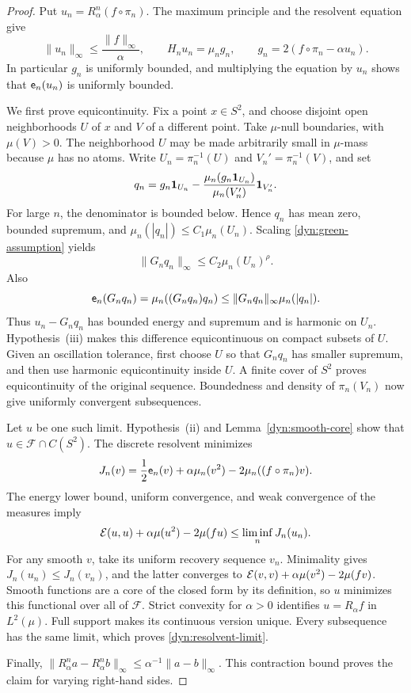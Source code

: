 \begin{proof}
Put $u_n=R^n_\alpha(f\circ\pi_n)$.  The maximum principle and the
resolvent equation give
\begin{equation}\label{dyn:resolvent-bounds}
 \|u_n\|_\infty\le\frac{\|f\|_\infty}{\alpha},
 \qquad
 H_nu_n=\mu_n g_n,
 \qquad
 g_n=2(f\circ\pi_n-\alpha u_n).
\end{equation}
In particular $g_n$ is uniformly bounded, and multiplying the equation
by $u_n$ shows that $\mathsf e_n(u_n)$ is uniformly bounded.

We first prove equicontinuity.  Fix a point $x\in S^2$, and choose
disjoint open neighborhoods $U$ of $x$ and $V$ of a different point.
Take $\mu$-null boundaries, with $\mu(V)>0$.  The neighborhood $U$
may be made arbitrarily small in $\mu$-mass because $\mu$ has no
atoms.  Write $U_n=\pi_n^{-1}(U)$ and $V_n'=\pi_n^{-1}(V)$, and set
\[
 q_n=g_n\mathbf 1_{U_n}
       -\frac{\mu_n(g_n\mathbf 1_{U_n})}{\mu_n(V_n')}\mathbf 1_{V_n'}.
\]
For large $n$, the denominator is bounded below.  Hence $q_n$ has
mean zero, bounded supremum, and
$\mu_n(|q_n|)\le C_1\mu_n(U_n)$.  Scaling
\eqref{dyn:green-assumption} yields
\[
 \|G_nq_n\|_\infty\le C_2\mu_n(U_n)^\rho.
\]
Also
\[
 \mathsf e_n(G_nq_n)=\mu_n((G_nq_n)q_n)
 \le\|G_nq_n\|_\infty\mu_n(|q_n|).
\]
Thus $u_n-G_nq_n$ has bounded energy and supremum and is harmonic
on $U_n$.  Hypothesis~(iii) makes this difference equicontinuous on
compact subsets of $U$.  Given an oscillation tolerance, first
choose $U$ so that $G_nq_n$ has smaller supremum, and then use
harmonic equicontinuity inside $U$.  A finite cover of $S^2$ proves
equicontinuity of the original sequence.  Boundedness and density of
$\pi_n(V_n)$ now give uniformly convergent subsequences.

Let $u$ be one such limit.  Hypothesis~(ii) and
Lemma~\ref{dyn:smooth-core} show that $u\in\mathcal F\cap C(S^2)$.
The discrete resolvent minimizes
\[
 J_n(v)=\frac12\mathsf e_n(v)+\alpha\mu_n(v^2)
                       -2\mu_n((f\circ\pi_n)v).
\]
The energy lower bound, uniform convergence, and weak convergence of
the measures imply
\[
 \mathcal E(u,u)+\alpha\mu(u^2)-2\mu(fu)
       \le\liminf_n J_n(u_n).
\]
For any smooth $v$, take its uniform recovery sequence $v_n$.
Minimality gives $J_n(u_n)\le J_n(v_n)$, and the latter converges to
$\mathcal E(v,v)+\alpha\mu(v^2)-2\mu(fv)$.  Smooth functions are a core
of the closed form by its definition, so $u$ minimizes this
functional over all of $\mathcal F$.  Strict convexity for $\alpha>0$
identifies $u=R_\alpha f$ in $L^2(\mu)$.  Full support makes its
continuous version unique.  Every subsequence has the same limit,
which proves \eqref{dyn:resolvent-limit}.

Finally, $\|R^n_\alpha a-R^n_\alpha b\|_\infty
\le\alpha^{-1}\|a-b\|_\infty$.  This contraction bound proves the
claim for varying right-hand sides.
\end{proof}

